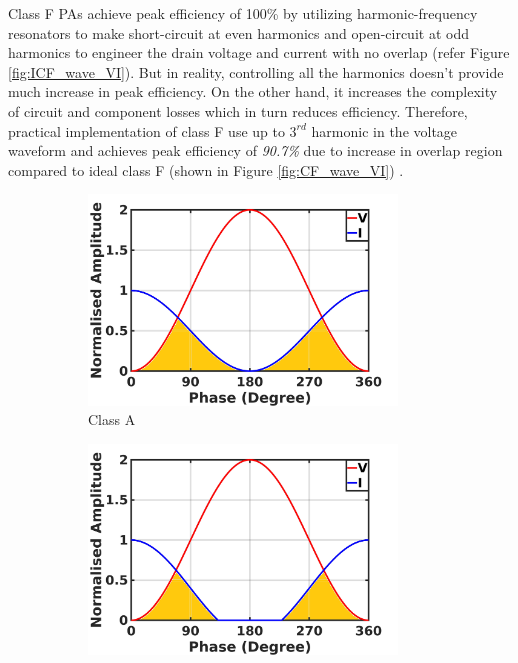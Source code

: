 \documentclass[conference]{IEEEtran}
\begin{document}
Class F PAs achieve peak efficiency of 100\% by utilizing harmonic-frequency resonators to make short-circuit at even harmonics and open-circuit at odd harmonics to engineer the drain voltage and current with no overlap (refer Figure \ref{fig:ICF_wave_VI}). But in reality, controlling all the harmonics doesn't provide much increase in peak efficiency. On the other hand, it increases the complexity of circuit and component losses which in turn reduces efficiency. Therefore, practical implementation of class F use up to $3^{rd}$ harmonic in the voltage waveform and achieves peak efficiency of \textit{90.7\%} due to increase in overlap region compared to ideal class F (shown in Figure \ref{fig:CF_wave_VI}) \cite{Raab_max_eff}.
\begin{figure}[h]
\centering
\captionsetup{font=footnotesize}
\begin{subfigure}{0.24\textwidth}
\includegraphics[width=0.9\textwidth]{Images/Intro/ClassA_shaded.jpg}
\caption{Class A}
\label{fig:CA_wave_VI}
\end{subfigure}
\begin{subfigure}{0.24\textwidth}
\includegraphics[width=0.9\textwidth]{Images/Intro/ClassB_shaded.jpg}

\end{subfigure}
\end{figure}
\end{document}
